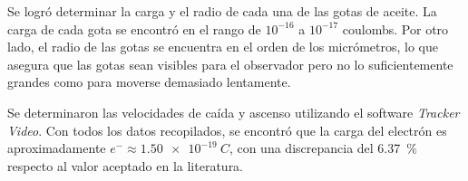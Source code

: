 Se logró determinar la carga y el radio de cada una de las gotas de aceite.
La carga de cada gota se encontró en el rango de $10^{-16}$ a $10^{-17}$ coulombs.
Por otro lado, el radio de las gotas se encuentra en el orden de los micrómetros,
lo que asegura que las gotas sean visibles para el observador pero no lo
suficientemente grandes como para moverse demasiado lentamente.

Se determinaron las velocidades de caída y ascenso utilizando el software
\emph{Tracker Video}.
Con todos los datos recopilados, se encontró que la carga del electrón es
aproximadamente \(e^- \approx \qty{1.50e-19}{C}\), con una discrepancia del
\qty{6.37}{\percent} respecto al valor aceptado en la literatura.


